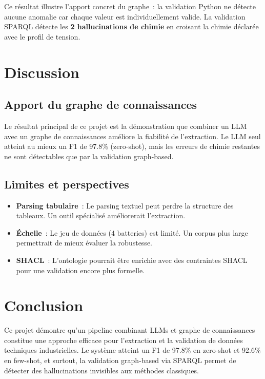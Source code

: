 \documentclass[12pt,a4paper]{article}
\begin{document}
Ce r\'esultat illustre l'apport concret du graphe~: la validation Python ne d\'etecte aucune anomalie car chaque valeur est individuellement valide. La validation SPARQL d\'etecte les \textbf{2 hallucinations de chimie} en croisant la chimie d\'eclar\'ee avec le profil de tension.

\section{Discussion}

\subsection{Apport du graphe de connaissances}

Le r\'esultat principal de ce projet est la d\'emonstration que combiner un LLM avec un graphe de connaissances am\'eliore la fiabilit\'e de l'extraction. Le LLM seul atteint au mieux un F1 de 97.8\% (zero-shot), mais les erreurs de chimie restantes ne sont d\'etectables que par la validation graph-based.

\subsection{Limites et perspectives}

\begin{itemize}
    \item \textbf{Parsing tabulaire}~: Le parsing textuel peut perdre la structure des tableaux. Un outil sp\'ecialis\'e am\'eliorerait l'extraction.
    \item \textbf{\'Echelle}~: Le jeu de donn\'ees (4 batteries) est limit\'e. Un corpus plus large permettrait de mieux \'evaluer la robustesse.
    \item \textbf{SHACL}~: L'ontologie pourrait \^etre enrichie avec des contraintes SHACL pour une validation encore plus formelle.
\end{itemize}

\section{Conclusion}

Ce projet d\'emontre qu'un pipeline combinant LLMs et graphe de connaissances constitue une approche efficace pour l'extraction et la validation de donn\'ees techniques industrielles. Le syst\`eme atteint un F1 de 97.8\% en zero-shot et 92.6\% en few-shot, et surtout, la validation graph-based via SPARQL permet de d\'etecter des hallucinations invisibles aux m\'ethodes classiques.
\end{document}
